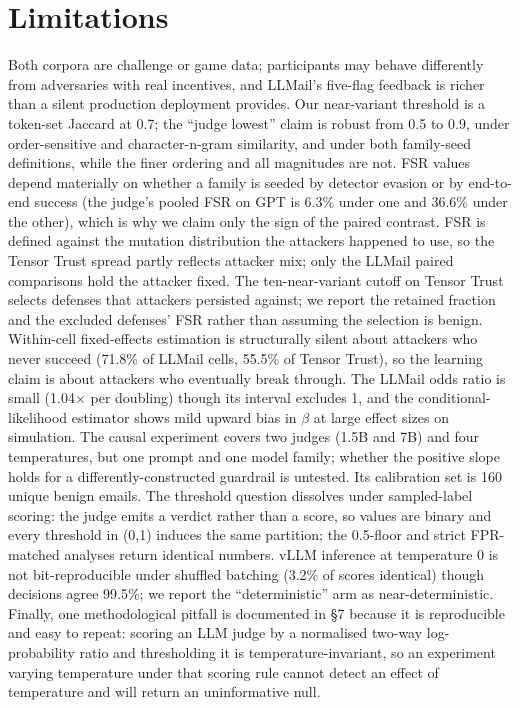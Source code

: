 \documentclass[conference]{IEEEtran}
\begin{document}
\section{Limitations}

Both corpora are challenge or game data; participants may behave differently from adversaries with real incentives, and LLMail's five-flag feedback is richer than a silent production deployment provides. Our near-variant threshold is a token-set Jaccard at 0.7; the ``judge lowest'' claim is robust from 0.5 to 0.9, under order-sensitive and character-n-gram similarity, and under both family-seed definitions, while the finer ordering and all magnitudes are not. FSR values depend materially on whether a family is seeded by detector evasion or by end-to-end success (the judge's pooled FSR on GPT is 6.3\% under one and 36.6\% under the other), which is why we claim only the sign of the paired contrast. FSR is defined against the mutation distribution the attackers happened to use, so the Tensor Trust spread partly reflects attacker mix; only the LLMail paired comparisons hold the attacker fixed. The ten-near-variant cutoff on Tensor Trust selects defenses that attackers persisted against; we report the retained fraction and the excluded defenses' FSR rather than assuming the selection is benign. Within-cell fixed-effects estimation is structurally silent about attackers who never succeed (71.8\% of LLMail cells, 55.5\% of Tensor Trust), so the learning claim is about attackers who eventually break through. The LLMail odds ratio is small (1.04$\times$ per doubling) though its interval excludes 1, and the conditional-likelihood estimator shows mild upward bias in \textbar{}$\beta$\textbar{} at large effect sizes on simulation. The causal experiment covers two judges (1.5B and 7B) and four temperatures, but one prompt and one model family; whether the positive slope holds for a differently-constructed guardrail is untested. Its calibration set is 160 unique benign emails. The threshold question dissolves under sampled-label scoring: the judge emits a verdict rather than a score, so values are binary and every threshold in (0,1) induces the same partition; the 0.5-floor and strict FPR-matched analyses return identical numbers. vLLM inference at temperature 0 is not bit-reproducible under shuffled batching (3.2\% of scores identical) though decisions agree 99.5\%; we report the ``deterministic'' arm as near-deterministic. Finally, one methodological pitfall is documented in \S7 because it is reproducible and easy to repeat: scoring an LLM judge by a normalised two-way log-probability ratio and thresholding it is temperature-invariant, so an experiment varying temperature under that scoring rule cannot detect an effect of temperature and will return an uninformative null.
\end{document}
